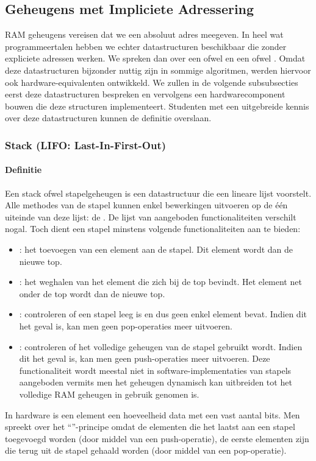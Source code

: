 \subsection{Geheugens met Impliciete Adressering}
RAM geheugens vereisen dat we een absoluut adres meegeven. In heel wat programmeertalen hebben we echter datastructuren beschikbaar die zonder expliciete adressen werken. We spreken dan over een  ofwel  en een  ofwel . Omdat deze datastructuren bijzonder nuttig zijn in sommige algoritmen, werden hiervoor ook hardware-equivalenten ontwikkeld. We zullen in de volgende subsubsecties eerst deze datastructuren bespreken en vervolgens een hardwarecomponent bouwen die deze structuren implementeert. Studenten met een uitgebreide kennis over deze datastructuren kunnen de definitie overslaan.
\subsubsection{Stack (LIFO: Last-In-First-Out)}
\paragraph{Definitie}Een stack ofwel stapelgeheugen is een datastructuur die een lineare lijst voorstelt. Alle methodes van de stapel kunnen enkel bewerkingen uitvoeren op de \'e\'en uiteinde van deze lijst: de . De lijst van aangeboden functionaliteiten verschilt nogal. Toch dient een stapel minstens volgende functionaliteiten aan te bieden:
\begin{itemize}
 \item {}: het toevoegen van een element aan de stapel. Dit element wordt dan de nieuwe top.
 \item {}: het weghalen van het element die zich bij de top bevindt. Het element net onder de top wordt dan de nieuwe top.
 \item {}: controleren of een stapel leeg is en dus geen enkel element bevat. Indien dit het geval is, kan men geen pop-operaties meer uitvoeren.
 \item {}: controleren of het volledige geheugen van de stapel gebruikt wordt. Indien dit het geval is, kan men geen push-operaties meer uitvoeren. Deze functionaliteit wordt meestal niet in software-implementaties van stapels aangeboden vermits men het geheugen dynamisch kan uitbreiden tot het volledige RAM geheugen in gebruik genomen is.
\end{itemize}
In hardware is een element een hoeveelheid data met een vast aantal bits. Men spreekt over het ``''-principe omdat de elementen die het laatst aan een stapel toegevoegd worden (door middel van een push-operatie), de eerste elementen zijn die terug uit de stapel gehaald worden (door middel van een pop-operatie).

